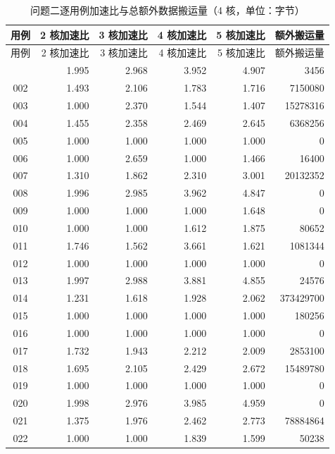 \scriptsize
\setlength{\tabcolsep}{2.5pt}
\renewcommand{\arraystretch}{0.95}
\begin{longtable}{|c|r|r|r|r|r|}
\caption{问题二逐用例加速比与总额外数据搬运量（4 核，单位：字节）}\label{tab:q2_speedup}\\
\hline
用例 & 2 核加速比 & 3 核加速比 & 4 核加速比 & 5 核加速比 & 额外搬运量 \\
\hline
\endfirsthead
\hline
用例 & 2 核加速比 & 3 核加速比 & 4 核加速比 & 5 核加速比 & 额外搬运量 \\
\hline
\endhead
\hline
\endfoot
001 & 1.995 & 2.968 & 3.952 & 4.907 & 3456 \\
\hline
002 & 1.493 & 2.106 & 1.783 & 1.716 & 7150080 \\
\hline
003 & 1.000 & 2.370 & 1.544 & 1.407 & 15278316 \\
\hline
004 & 1.455 & 2.358 & 2.469 & 2.645 & 6368256 \\
\hline
005 & 1.000 & 1.000 & 1.000 & 1.000 & 0 \\
\hline
006 & 1.000 & 2.659 & 1.000 & 1.466 & 16400 \\
\hline
007 & 1.310 & 1.862 & 2.310 & 3.001 & 20132352 \\
\hline
008 & 1.996 & 2.985 & 3.962 & 4.847 & 0 \\
\hline
009 & 1.000 & 1.000 & 1.000 & 1.648 & 0 \\
\hline
010 & 1.000 & 1.000 & 1.612 & 1.875 & 80652 \\
\hline
011 & 1.746 & 1.562 & 3.661 & 1.621 & 1081344 \\
\hline
012 & 1.000 & 1.000 & 1.000 & 1.000 & 0 \\
\hline
013 & 1.997 & 2.988 & 3.881 & 4.855 & 24576 \\
\hline
014 & 1.231 & 1.618 & 1.928 & 2.062 & 373429700 \\
\hline
015 & 1.000 & 1.000 & 1.000 & 1.000 & 180256 \\
\hline
016 & 1.000 & 1.000 & 1.000 & 1.000 & 0 \\
\hline
017 & 1.732 & 1.943 & 2.212 & 2.009 & 2853100 \\
\hline
018 & 1.695 & 2.105 & 2.429 & 2.672 & 15489780 \\
\hline
019 & 1.000 & 1.000 & 1.000 & 1.000 & 0 \\
\hline
020 & 1.998 & 2.976 & 3.985 & 4.959 & 0 \\
\hline
021 & 1.375 & 1.976 & 2.462 & 2.773 & 78884864 \\
\hline
022 & 1.000 & 1.000 & 1.839 & 1.599 & 50238 \\

\end{longtable}
